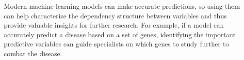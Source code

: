 \documentclass{article}
\theoremstyle{plain}
\theoremstyle{definition}
\theoremstyle{remark}
\begin{document}


%
Modern machine learning models can make accurate predictions, so using them can help characterize the dependency structure between variables and thus provide valuable insights for further research.   
%
For example, if a model can accurately predict a disease based on a set of genes, identifying the important predictive variables can guide specialists on which genes to study further to combat the disease.
\end{document}
